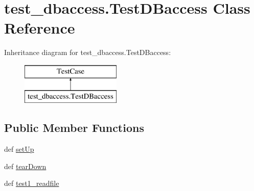 \hypertarget{classtest__dbaccess_1_1_test_d_baccess}{\section{test\-\_\-dbaccess.\-Test\-D\-Baccess Class Reference}
\label{classtest__dbaccess_1_1_test_d_baccess}
}
Inheritance diagram for test\-\_\-dbaccess.\-Test\-D\-Baccess\-:\begin{figure}[H]
\begin{center}
\leavevmode
\includegraphics[height=2.000000cm]{classtest__dbaccess_1_1_test_d_baccess}
\end{center}
\end{figure}
\subsection*{Public Member Functions}
\begin{DoxyCompactItemize}
\item 
def \hyperlink{classtest__dbaccess_1_1_test_d_baccess_a772a12714e7eabb3e425a38199f615d8}{set\-Up}
\item 
def \hyperlink{classtest__dbaccess_1_1_test_d_baccess_a56792c35c47f03be12bc1880b7180adc}{tear\-Down}
\item 
def \hyperlink{classtest__dbaccess_1_1_test_d_baccess_a0eec2c586e1243ab3d9f24f208446494}{test1\-\_\-readfile}
\end{DoxyCompactItemize}



